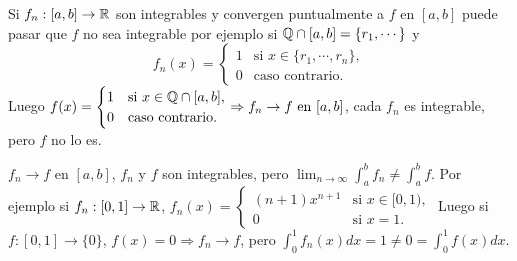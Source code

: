 \begin{note}
  Si $f_n: [a, b] \to \mathbb{R}$ son integrables y convergen puntualmente a $f$ en $[a, b]$ puede pasar que $f$ no sea integrable por ejemplo si $\mathbb{Q} \cap [a, b] = \{r_1, \cdots\}$ y 
  \begin{equation}
    f_n(x) = \begin{cases}
      1 & \text{si } x \in \{r_1, \cdots, r_n\}, \\
      0 & \text{caso contrario}.
    \end{cases}
  \end{equation}
  Luego $f(x) = \begin{cases}
    1 & \text{si } x \in \mathbb{Q} \cap [a, b], \\
    0 & \text{caso contrario}.
  \end{cases} \Rightarrow f_n \to f \text{ en } [a, b]$, cada $f_n$ es integrable, pero $f$ no lo es.
\end{note}

\begin{note}
  $f_n \to f$ en $[a, b]$, $f_n$ y $f$ son integrables, pero $\lim_{n \to \infty} \int_a^b f_n \neq \int_a^b f$. Por ejemplo si $f_n: [0, 1] \to \mathbb{R}$, $f_n(x) = \begin{cases}
    (n+1) x^{n+1} & \text{si } x \in [0, 1), \\
    0 & \text{si } x = 1.
  \end{cases}$ Luego si $f: [0, 1] \to \{0\}$, $f(x) = 0 \Rightarrow f_n \to f$, pero $\int_0^1 f_n(x) dx = 1 \neq 0 = \int_0^1 f(x) dx$. 
\end{note}
